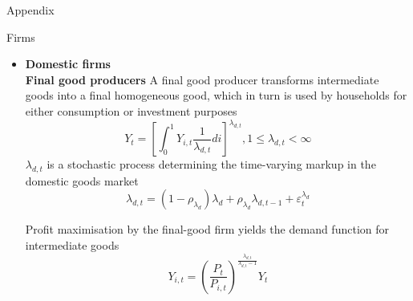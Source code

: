 \documentclass[9pt]{beamer}
\let\olditem\item
\renewcommand{\item}{%
\olditem\vspace{\fill}}
\begin{document}



\begin{frame}[noframenumbering]

    
Appendix
\end{frame}

\begin{frame}{Firms}
\begin{itemize}
    \item \textbf{Domestic firms} \\
    
    \textbf{Final good producers} A final good producer transforms intermediate goods into a final homogeneous good, which in turn is used by households for either consumption or investment purposes
$$
    Y_{t}=\left[\int_{0}^{1} Y_{i, t} \frac{1}{\lambda_{d, t}} d i\right]^{\lambda_{d, t}}, 1 \leq \lambda_{d, t}<\infty
$$
$\lambda_{d, t}$ is a stochastic process determining the time-varying markup in the domestic goods market
$$
\lambda_{d, t}=\left(1-\rho_{\lambda_{d}}\right) \lambda_{d}+\rho_{\lambda_{d}} \lambda_{d, t-1}+\varepsilon_{t}^{\lambda_{d}}
$$
    
Profit maximisation by the final-good firm yields the demand
function for intermediate goods
$$
    Y_{i, t}=\left(\frac{P_{t}}{P_{i, t}}\right)^{\frac{\lambda_{d, t}}{\lambda_{d, t}-1}} Y_{t}
$$
    
\end{itemize}


\end{frame}
\end{document}
